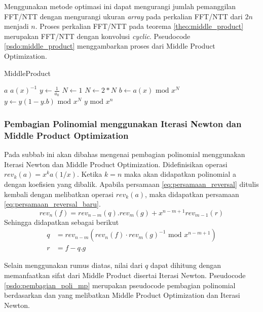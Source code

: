 Menggunakan metode optimasi ini dapat mengurangi jumlah pemanggilan FFT/NTT dengan mengurangi ukuran \textit{array} pada perkalian FFT/NTT dari $ 2n $ menjadi $ n $. Proses perkalian FFT/NTT pada teorema \ref{theo:middle_product} merupakan FFT/NTT dengan konvolusi \textit{cyclic}. Pseudocode \ref{psdo:middle_product} menggambarkan proses dari Middle Product Optimization.

\begin{algorithm}
	\caption{MiddleProduct}
	\label{psdo:middle_product}
	\begin{algorithmic}[1]
		\Require $ a $
		\Ensure $ a(x)^{-1} $
		\State $ y \leftarrow \frac{1}{a_0} $
		\State $ N \leftarrow 1 $
			\State $ N \leftarrow 2 * N $
			\State $ b \leftarrow a(x) \text{ mod } x^N $
			\State $ y \leftarrow y(1- y.b) \text{ mod } x^N $
		\EndWhile
		\State \Return $ y \text{ mod } x^n $
	\end{algorithmic}
\end{algorithm}


\subsubsection{ Pembagian Polinomial menggunakan Iterasi Newton dan Middle Product Optimization}
Pada subbab ini akan dibahas mengenai pembagian polinomial menggunakan Iterasi Newton dan Middle Product Optimization. Didefinisikan operasi $ rev_k(a) = x^ka(1/x) $. Ketika $ k = n $ maka akan didapatkan polinomial a dengan koefisien yang dibalik. Apabila persamaan \eqref{eq:persamaan_reversal} ditulis kembali dengan melibatkan operasi $ rev_k(a) $, maka didapatkan persamaan \eqref{eq:persamaan_reversal_baru}.
\begin{equation}
	rev_n(f) = rev_{n-m}(q).rev_m(g)+x^{n-m+1}rev_{m-1}(r)
	\label{eq:persamaan_reversal_baru}
\end{equation}
Sehingga didapatkan sebagai berikut
\begin{equation}
	\begin{aligned}
		q &= rev_{n-m}(rev_{n}(f) \cdot rev_{m}(g)^{-1} \text{ mod } x^{n - m + 1}) \\
		r &= f - q.g
	\end{aligned}
\end{equation}

Selain menggunakan rumus diatas, nilai dari $ q $ dapat dihitung dengan memanfaatkan sifat dari Middle Product disertai Iterasi Newton. Pseudocode \ref{psdo:pembagian_poli_mp} merupakan pseudocode pembagian polinomial berdasarkan \cite{middle_product_hal} dan \cite{middle_product_op} yang melibatkan Middle Product Optimization dan Iterasi Newton. 

